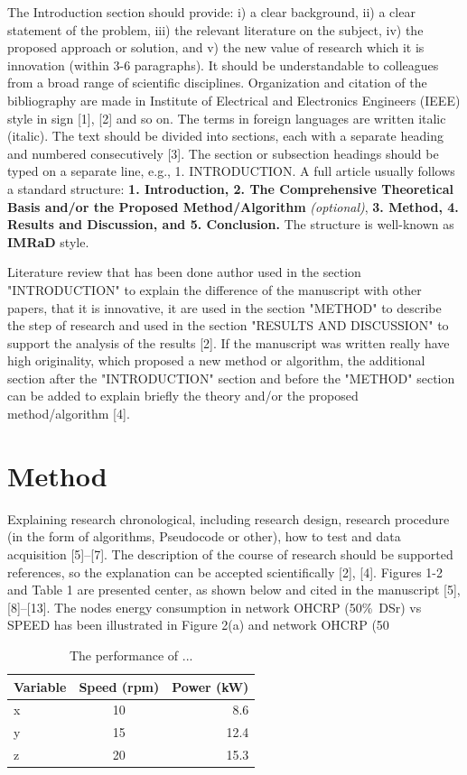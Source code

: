 \documentclass{telkomnika}
\begin{document}
The Introduction section should provide: i) a clear background, ii) a clear statement of the problem, iii) the relevant literature on the subject, iv) the proposed approach or solution, and v) the new value of research which it is innovation (within 3-6 paragraphs). It should be understandable to colleagues from a broad range of scientific disciplines. Organization and citation of the bibliography are made in Institute of Electrical and Electronics Engineers (IEEE) style in sign [1], [2] and so on. The terms in foreign languages are written italic (italic). The text should be divided into sections, each with a separate heading and numbered consecutively [3]. The section or subsection headings should be typed on a separate line, e.g., 1. INTRODUCTION. A full article usually follows a standard structure: \textbf{1. Introduction, 2. The Comprehensive Theoretical Basis and/or the Proposed Method/Algorithm} \textit{(optional)},\textbf{ 3. Method, 4. Results and Discussion, and 5. Conclusion.} The structure is well-known as \textbf{IMRaD} style.

Literature review that has been done author used in the section "INTRODUCTION" to explain 
the difference of the manuscript with other papers, that it is innovative, it are used in the section "METHOD" to describe the step of research and used in the section "RESULTS AND DISCUSSION" to support the analysis of the results [2]. If the manuscript was written really have high originality, which proposed a new method or algorithm, the additional section after the "INTRODUCTION" section and before the "METHOD" section can be added to explain briefly the theory and/or the proposed method/algorithm [4].


\section{Method}
\label{}
Explaining research chronological, including research design, research procedure (in the form of algorithms, Pseudocode or other), how to test and data acquisition [5]–[7]. The description of the course of research should be supported references, so the explanation can be accepted scientifically [2], [4]. Figures 1-2 and Table 1 are presented center, as shown below and cited in the manuscript [5], [8]–[13]. The nodes energy consumption in network OHCRP (50\%\ DSr) vs SPEED has been illustrated in Figure 2(a) and network OHCRP (50%


\begin{table}[H]
\centering
\fontsize{8pt}{10pt}\selectfont
\caption{The performance of ...}
\begin{tabular}{lcr}
\hline
Variable & Speed (rpm) & Power (kW) \\
\hline
x & 10 & 8.6 \\
y & 15 & 12.4 \\
z & 20 & 15.3 \\
\hline
\end{tabular}
\end{table}
\end{document}
